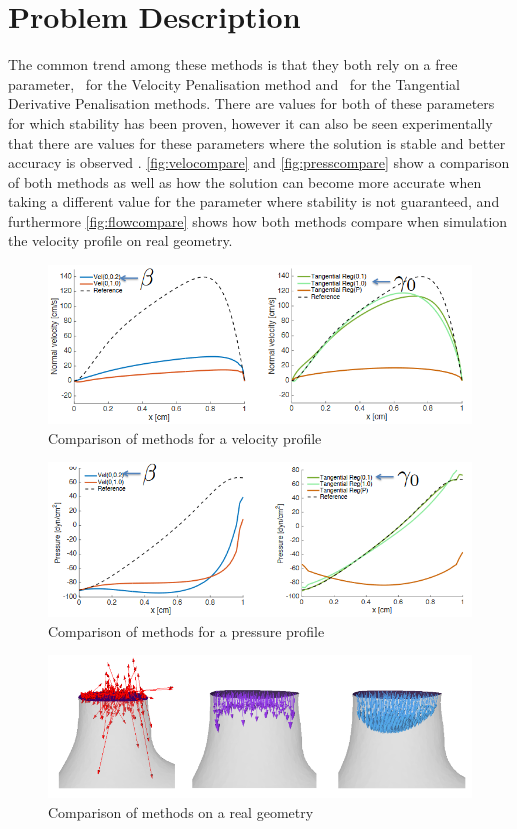 \section{Problem Description}
The common trend among these methods is that they both rely on a free parameter, \mbeta~for the Velocity Penalisation method and \mgamma~for the Tangential Derivative Penalisation methods. There are values for both of these parameters for which stability has been proven, however it can also be seen experimentally that there are values for these parameters where the solution is stable and better accuracy is observed \cite{bertoglio2014}. \autoref{fig:velocompare} and \autoref{fig:presscompare} show a comparison of both methods as well as how the solution can become more accurate when taking a different value for the parameter where stability is not guaranteed, and furthermore \autoref{fig:flowcompare} shows how both methods compare when simulation the velocity profile on real geometry.\\
\begin{figure}[t]
\centering
\includegraphics[width=12cm]{media/compare.PNG}
\caption{Comparison of methods for a velocity profile\label{fig:velocompare}}
\end{figure}
\begin{figure}[t]
\centering
\includegraphics[width=12cm]{media/presscompare.PNG}
\caption{Comparison of methods for a pressure profile\label{fig:presscompare}}
\end{figure}
\begin{figure}[t]
\centering
\includegraphics[width=12cm]{media/flowcomp.PNG}
\caption{Comparison of methods on a real geometry\label{fig:flowcompare}}
\end{figure}

